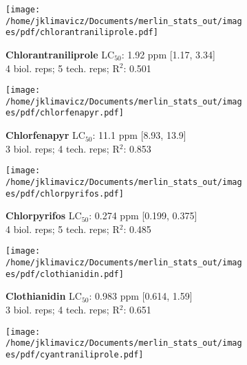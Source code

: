 \documentclass{article}
\begin{document}
\begin{figure}[thp!]
   \begin{subfigure}{0.500\textwidth}
      \centering
      \texttt{[image: /home/jklimavicz/Documents/merlin\_stats\_out/images/pdf/chlorantraniliprole.pdf]}
      \vspace{-0.05cm}
      \caption*{\textbf{Chlorantraniliprole} LC$_{50}$: 1.92 ppm [1.17, 3.34] \\ 
4 biol. reps; 5 tech. reps; R$^2$: 0.501}
      \vspace{0.1cm}
   \end{subfigure}%
   \begin{subfigure}{0.500\textwidth}
      \centering
      \texttt{[image: /home/jklimavicz/Documents/merlin\_stats\_out/images/pdf/chlorfenapyr.pdf]}
      \vspace{-0.05cm}
      \caption*{\textbf{Chlorfenapyr} LC$_{50}$: 11.1 ppm [8.93, 13.9] \\ 
3 biol. reps; 4 tech. reps; R$^2$: 0.853}
      \vspace{0.1cm}
   \end{subfigure}%
\vspace{-0.1cm}
   \begin{subfigure}{0.500\textwidth}
      \centering
      \texttt{[image: /home/jklimavicz/Documents/merlin\_stats\_out/images/pdf/chlorpyrifos.pdf]}
      \vspace{-0.05cm}
      \caption*{\textbf{Chlorpyrifos} LC$_{50}$: 0.274 ppm [0.199, 0.375] \\ 
4 biol. reps; 5 tech. reps; R$^2$: 0.485}
      \vspace{0.1cm}
   \end{subfigure}%
   \begin{subfigure}{0.500\textwidth}
      \centering
      \texttt{[image: /home/jklimavicz/Documents/merlin\_stats\_out/images/pdf/clothianidin.pdf]}
      \vspace{-0.05cm}
      \caption*{\textbf{Clothianidin} LC$_{50}$: 0.983 ppm [0.614, 1.59] \\ 
3 biol. reps; 4 tech. reps; R$^2$: 0.651}
      \vspace{0.1cm}
   \end{subfigure}%
\vspace{-0.1cm}
   \begin{subfigure}{0.500\textwidth}
      \centering
      \texttt{[image: /home/jklimavicz/Documents/merlin\_stats\_out/images/pdf/cyantraniliprole.pdf]}

\end{subfigure}
\end{figure}
\end{document}
